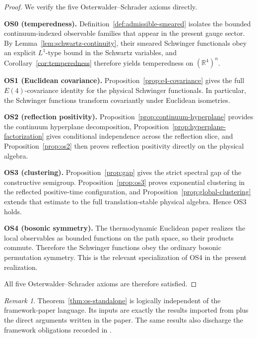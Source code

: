 \documentclass[11pt]{article}
\theoremstyle{definition}
\theoremstyle{remark}
\newtheorem{remark}[theorem]{Remark}
\newcommand{\R}{\mathbb R}
\begin{document}
\begin{proof}
We verify the five Osterwalder--Schrader axioms directly.

\textbf{OS0 (temperedness).}
Definition~\ref{def:admissible-smeared} isolates the bounded continuum-indexed
observable families that appear in the present gauge sector.  By
Lemma~\ref{lem:schwartz-continuity}, their smeared Schwinger functionals obey an
explicit \(L^1\)-type bound in the Schwartz variables, and
Corollary~\ref{cor:temperedness} therefore yields temperedness on
\((\R^4)^n\).

\textbf{OS1 (Euclidean covariance).}
Proposition~\ref{prop:e4-covariance} gives the full \(E(4)\)-covariance
identity for the physical Schwinger functionals.  In particular, the
Schwinger functions transform covariantly under Euclidean isometries.

\textbf{OS2 (reflection positivity).}
Proposition~\ref{prop:continuum-hyperplane} provides the continuum hyperplane
decomposition, Proposition~\ref{prop:hyperplane-factorization} gives conditional
independence across the reflection slice, and Proposition~\ref{prop:os2} then
proves reflection positivity directly on the physical algebra.

\textbf{OS3 (clustering).}
Proposition~\ref{prop:gap} gives the strict spectral gap of the constructive
semigroup.  Proposition~\ref{prop:os3} proves exponential clustering in the
reflected positive-time configuration, and Proposition~\ref{prop:global-clustering}
extends that estimate to the full translation-stable physical algebra.  Hence
OS3 holds.

\textbf{OS4 (bosonic symmetry).}
The thermodynamic Euclidean paper realizes the local observables as bounded
functions on the path space, so their products commute.  Therefore the
Schwinger functions obey the ordinary bosonic permutation symmetry.  This is
the relevant specialization of OS4 in the present realization.

All five Osterwalder--Schrader axioms are therefore satisfied.
\end{proof}

\begin{remark}
Theorem~\ref{thm:os-standalone} is logically independent of the framework-paper
language.  Its inputs are exactly the results imported from
\cite{convergence,lattice,quantization} plus the direct arguments written in the
paper.  The same results also discharge the framework obligations
recorded in \cite{axioms}.
\end{remark}
\end{document}
